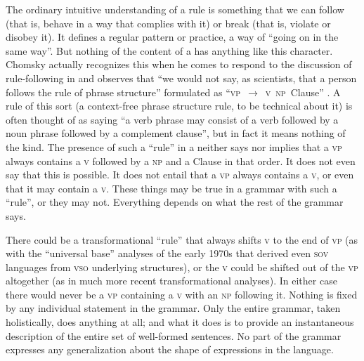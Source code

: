 \documentclass[output=paper]{langscibook}
\begin{document}
The ordinary intuitive understanding of a rule is something that we can follow (that is, behave in a way that complies with it) or break (that is, violate or disobey it).  It defines a regular pattern or practice, a way of ``going on in the same way''.  But nothing of the content of a  has anything like this character. Chomsky actually recognizes this when he comes to respond to the discussion of rule-following in \citet{Kripke82} and observes that ``we would not say, as scientists, that a person follows the rule of phrase structure'' formulated as ``\textsc{vp}~$\rightarrow$~\textsc{v}~\textsc{np}~Clause'' \citep[243]{Chomsky86KL}. A rule of this sort (a context-free phrase structure rule, to be technical about it) is often thought of as saying ``a verb phrase may consist of a verb followed by a noun phrase followed by a complement clause'', but in fact it means nothing of the kind.  The presence of such a ``rule'' in a  neither says nor implies that a \textsc{vp} always contains a \textsc{v} followed by a \textsc{np} and a Clause in that order.  It does not even say that this is possible.  It does not entail that a \textsc{vp} always contains a \textsc{v}, or even that it may contain a \textsc{v}.  These things may be true in a grammar with such a ``rule'', or they may not. Everything depends on what the rest of the grammar says.

There could be a transformational ``rule'' that always shifts \textsc{v} to the end of \textsc{vp} (as with the ``universal base'' analyses of the early 1970s that derived even \textsc{sov} languages from \textsc{vso} underlying structures), or the \textsc{v} could be shifted out of the \textsc{vp} altogether (as in much more recent transformational analyses).  In either case there would never be a \textsc{vp} containing a \textsc{v} with an \textsc{np} following it. Nothing is fixed by any individual statement in the grammar. Only the entire grammar, taken holistically, does anything at all; and what it does is to provide an instantaneous description of the entire set of well-formed sentences. No part of the grammar expresses any generalization about the shape of expressions in the language.
\end{document}
